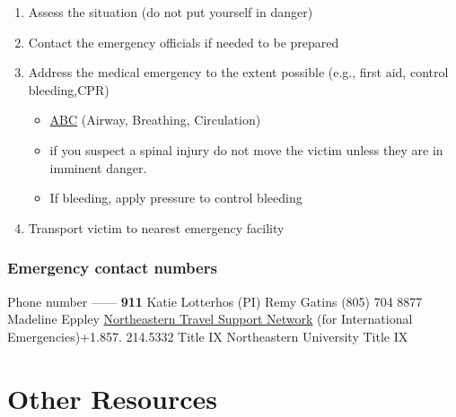\documentclass[
  letterpaper,
  DIV=11,
  numbers=noendperiod]{scrreprt}
\begin{document}
\begin{enumerate}
\def\labelenumi{\arabic{enumi}.}
\item
  Assess the situation (do not put yourself in danger)
\item
  Contact the emergency officials if needed to be prepared
\item
  Address the medical emergency to the extent possible (e.g., first aid,
  control bleeding,CPR)

  \begin{itemize}
  \item
    \href{https://en.wikipedia.org/wiki/ABC_(medicine)}{ABC} (Airway,
    Breathing, Circulation)
  \item
    if you suspect a spinal injury do not move the victim unless they
    are in imminent danger.
  \item
    If bleeding, apply pressure to control bleeding
  \end{itemize}
\item
  Transport victim to nearest emergency facility
\end{enumerate}

\hypertarget{emergency-contact-numbers}{%
\subsubsection*{\texorpdfstring{\textbf{Emergency contact
numbers}}{Emergency contact numbers}}\label{emergency-contact-numbers}}

\textbar\textbar{} Phone number\textbar{}
\textbar---\textbar---\textbar{}
\textbar\textbar{}\textbf{911}\textbar{} \textbar Katie Lotterhos
(PI)\textbar\textbar{} \textbar Remy Gatins \textbar(805) 704
8877\textbar{} \textbar Madeline Eppley\textbar\textbar{}
\textbar{}\href{https://provost.northeastern.edu/international-travel/health-safety/emergency-assistance/}{Northeastern
Travel Support Network} (for International Emergencies)\textbar+1.857.
214.5332\textbar{} \textbar Title IX Northeastern
University\textbar\textbar{} \textbar Title IX \textbar\textbar{}

\hypertarget{other-resources}{%
\section*{\texorpdfstring{\textbf{Other
Resources}}{Other Resources}}\label{other-resources}}
\end{document}

